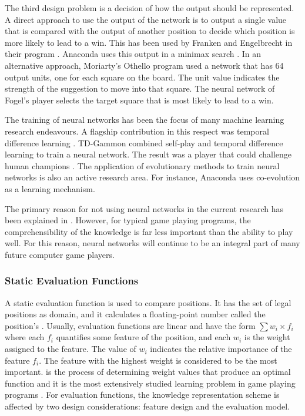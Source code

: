 The third design problem is a decision of how the output should be represented. A direct approach to use the output of the network is to output a single value that is compared with the output of another position to decide which position is more likely to lead to a win. This has been used by Franken and Engelbrecht in their  program \cite{franken:checkers}. Anaconda uses this output in a minimax search \cite{davis:evolve}. In an alternative approach, Moriarty's Othello program used a network that has 64 output units, one for each square on the board. The unit value indicates the strength of the suggestion to move into that square.  The neural network of Fogel's  player selects the target square that is most likely to lead to a win.

The training of neural networks has been the focus of many machine learning research endeavours.  A flagship contribution in this respect was temporal difference learning \cite{tesauro:learning}. TD-Gammon combined self-play and temporal difference learning to train a neural network.  The result was a  player that could challenge human champions \cite{schaeffer:games,tesauro:learning}.  The application of evolutionary methods to train neural networks is also an active research area.  For instance, Anaconda uses co-evolution as a learning mechanism.

The primary reason for not using neural networks in the current research has been explained in .  However, for typical game playing programs, the comprehensibility of the knowledge is far less important than the ability to play well.  For this reason, neural networks will continue to be an integral part of many future computer game players.

\subsubsection{Static Evaluation Functions}
\label{sec:functions}
A static evaluation function is used to compare positions.  It has the set of legal positions as domain, and it calculates a floating-point number called the position's .  Usually, evaluation functions are linear and have the form $\sum w_i \times f_i$ where each $f_i$ quantifies some feature of the position, and each $w_i$ is the weight assigned to the feature.  The value of $w_i$ indicates the relative importance of the feature $f_i$.  The feature with the highest weight is considered to be the most important.   is the process of determining weight values that produce an optimal function and it is the most extensively studied learning problem in game playing programs \cite{furnkranz:survey}.   For evaluation functions, the knowledge representation scheme is affected by two design considerations: feature design and the evaluation model.

